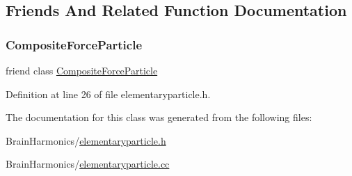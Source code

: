 \subsection{Friends And Related Function Documentation}
\mbox{\label{class_elementary_particle_a9bc6eb2a4c20ce83728a7c9a31b91f19}} 
\subsubsection{\texorpdfstring{Composite\+Force\+Particle}{CompositeForceParticle}}
{\footnotesize\ttfamily friend class \mbox{\hyperlink{class_composite_force_particle}{Composite\+Force\+Particle}}\hspace{0.3cm}{\ttfamily [friend]}}



Definition at line 26 of file elementaryparticle.\+h.



The documentation for this class was generated from the following files\+:\begin{DoxyCompactItemize}
\item 
Brain\+Harmonics/\mbox{\hyperlink{elementaryparticle_8h}{elementaryparticle.\+h}}\item 
Brain\+Harmonics/\mbox{\hyperlink{elementaryparticle_8cc}{elementaryparticle.\+cc}}\end{DoxyCompactItemize}
